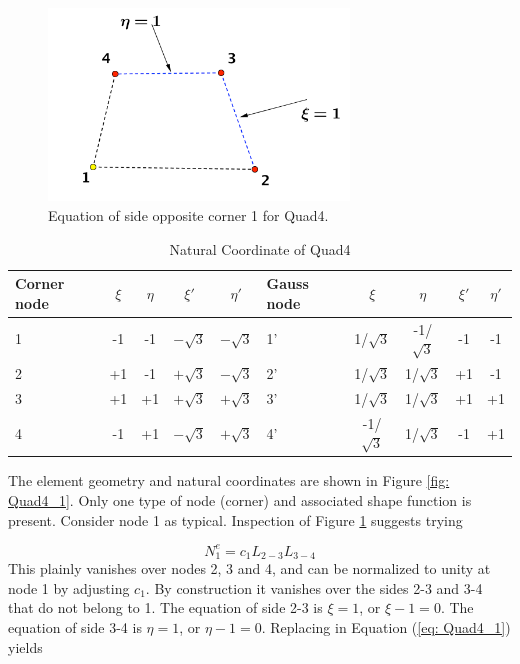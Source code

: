 \documentclass{article}
\begin{document}
\begin{figure}[h]
	\begin{center}
		\includegraphics[width=8cm,clip]{Quad4_2.pdf}			
		\caption{Equation of side opposite corner 1 for Quad4.} \label{fig: Quad4_2}
	\end{center} 
\end{figure}

\begin{table}
	\centering
	\caption{Natural Coordinate of Quad4}
	\label{tab: Quad4}
	\begin{tabular}{p{1cm}ccccp{1cm}cccc}			
		\hline
		Corner node\centering& $\xi$& $\eta$& $\xi'$& $\eta'$& Gauss node\centering& $\xi$& $\eta$& $\xi'$& $\eta'$ \\
		\hline
		1\centering& -1& -1& $-\sqrt{3}$& $-\sqrt{3}$& 1'\centering& 1/$\sqrt{3}$& -1/$\sqrt{3}$& -1& -1 \\
		2\centering& +1& -1& $+\sqrt{3}$& $-\sqrt{3}$& 2'\centering& 1/$\sqrt{3}$& 1/$\sqrt{3}$& +1& -1 \\
		3\centering& +1& +1& $+\sqrt{3}$& $+\sqrt{3}$& 3'\centering& 1/$\sqrt{3}$& 1/$\sqrt{3}$& +1& +1\\
		4\centering& -1& +1& $-\sqrt{3}$& $+\sqrt{3}$& 4'\centering& -1/$\sqrt{3}$& 1/$\sqrt{3}$& -1& +1\\
		\hline
	\end{tabular}
\end{table}		


The element geometry and natural coordinates are shown in Figure \ref{fig: Quad4_1}. Only one type of node (corner)  and associated shape function is present. Consider node 1 as typical. Inspection of Figure \ref{fig: Quad4_2} suggests trying

\begin{equation} \label{eq: Quad4_1}
N_1^e = c_1L_{2-3}L_{3-4}
\end{equation}
This plainly vanishes over nodes 2, 3 and 4, and can be normalized to unity at node 1 by adjusting $c_1$. By construction it vanishes over the sides 2-3 and 3-4 that do not belong to 1. The equation of side 2-3 is $\xi = 1$, or $\xi - 1 = 0$. The equation of side 3-4 is $\eta = 1$, or $\eta - 1 = 0$. Replacing in Equation (\ref{eq: Quad4_1}) yields
\end{document}
